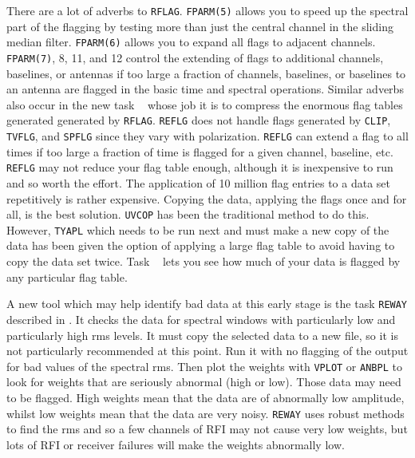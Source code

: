 There are a lot of adverbs to {\tt RFLAG}\@.  {\tt FPARM(5)} allows
you to speed up the spectral part of the flagging by testing more than
just the central channel in the sliding median filter.  {\tt FPARM(6)}
allows you to expand all flags to adjacent channels.  {\tt FPARM(7)},
8, 11, and 12 control the extending of flags to additional channels,
baselines, or antennas if too large a fraction of channels, baselines,
or baselines to an antenna are flagged in the basic time and spectral
operations.  Similar adverbs also occur in the new task {\tt
{}} whose job it is to compress the enormous flag tables
generated generated by {\tt RFLAG}\@.  {\tt REFLG} does not handle
flags generated by {\tt CLIP}, {\tt TVFLG}, and {\tt SPFLG} since they
vary with polarization.  {\tt REFLG} can extend a flag to all times if
too large a fraction of time is flagged for a given channel, baseline,
etc.  {\tt REFLG} may not reduce your flag table enough, although it
is inexpensive to run and so worth the effort.  The application of 10
million flag entries to a data set repetitively is rather expensive.
Copying the data, applying the flags once and for all, is the best
solution.  {\tt UVCOP} has been the traditional method to do this.
However, {\tt TYAPL} which needs to be run next and must make a new
copy of the data has been given the option of applying a large flag
table to avoid having to copy the data set twice.  Task {\tt
{}} lets you see how much of your data is flagged by any
particular flag table.

A new tool which may help identify bad data at this early stage is the
task {\tt REWAY} described in .  It checks the data for
spectral windows with particularly low and particularly high rms
levels.  It must copy the selected data to a new file, so it is not
particularly recommended at this point.  Run it with no flagging of
the output for bad values of the spectral rms.  Then plot the weights
with {\tt VPLOT} or {\tt ANBPL} to look for weights that are seriously
abnormal (high or low).  Those data may need to be flagged.  High
weights mean that the data are of abnormally low amplitude, whilst low
weights mean that the data are very noisy.  {\tt REWAY} uses robust
methods to find the rms and so a few channels of RFI may not cause
very low weights, but lots of RFI or receiver failures will make the
weights abnormally low.

